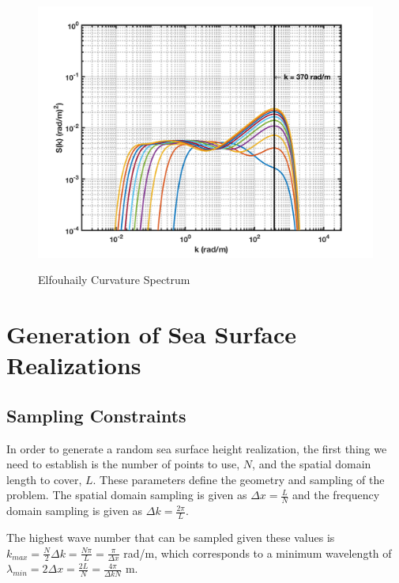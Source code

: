 \begin{figure}[H]
  \begin{center}
\includegraphics[width=5in]{../media/elf_curvature_spectrum.png}
  \end{center}
  \renewcommand{\baselinestretch}{1} \small\normalsize
  \begin{quote}
    \caption[Elfouhaily Curvature Spectrum]{Elfouhaily Curvature Spectrum\label{os_fig:6}}
  \end{quote}
\end{figure}
\renewcommand{\baselinestretch}{2} \small\normalsize


\section{Generation of Sea Surface Realizations}
\subsection{Sampling Constraints}
In order to generate a random sea surface height realization,  the first thing we need to establish is the number of points to use, $N$, and the spatial domain length to cover, $L$. These parameters define the geometry and sampling of the problem. The spatial domain sampling is given as $\Delta x = \frac{L}{N}$ and the frequency domain sampling is  given as $\Delta k = \frac{2\pi}{L}$.

The highest wave number that can be sampled given these values is $k_{max} = \frac{N}{2}\Delta k = \frac{N\pi}{L} = \frac{\pi}{\Delta x}$ rad/m, which corresponds to a minimum wavelength of $\lambda_{min} = 2\Delta x = \frac{2L}{N} = \frac{4\pi}{\Delta k N}$ m.

